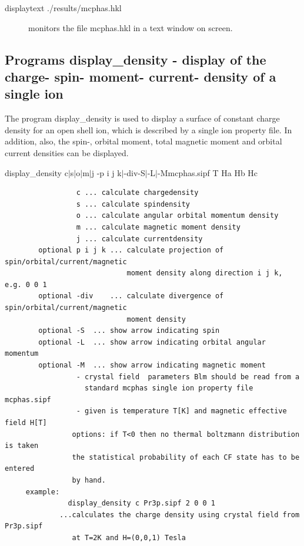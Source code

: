 \begin{description}
\item [displaytext ./results/mcphas.hkl] monitors the file mcphas.hkl in a text window
on screen.
\end{description} 

\subsection{Programs {\prg display\_density} 
- display of the charge- spin- moment- current- density of a single ion}\label{displaydensity}


The program {\prg display\_density} is used to display a surface of constant
charge density for an open shell ion, which is described by a single ion property file.
In addition, also, the spin-, orbital moment, total magnetic moment and orbital current
densities can be displayed. 


\begin{description} 
\item [ display\_density  c$|$s$|$o$|$m$|$j \lbrack -p i j k$|$-div\rbrack \lbrack -S$|$-L$|$-M\rbrack mcphas.sipf
 T Ha Hb Hc]
\end{description} 
\begin{verbatim}
                 c ... calculate chargedensity
                 s ... calculate spindensity
                 o ... calculate angular orbital momentum density
                 m ... calculate magnetic moment density
                 j ... calculate currentdensity
        optional p i j k ... calculate projection of spin/orbital/current/magnetic 
                             moment density along direction i j k, e.g. 0 0 1
        optional -div    ... calculate divergence of spin/orbital/current/magnetic 
                             moment density
        optional -S  ... show arrow indicating spin
        optional -L  ... show arrow indicating orbital angular momentum
        optional -M  ... show arrow indicating magnetic moment
                 - crystal field  parameters Blm should be read from a
                   standard mcphas single ion property file mcphas.sipf
                 - given is temperature T[K] and magnetic effective field H[T]
                options: if T<0 then no thermal boltzmann distribution is taken
                the statistical probability of each CF state has to be entered
                by hand.
     example:
               display_density c Pr3p.sipf 2 0 0 1
             ...calculates the charge density using crystal field from Pr3p.sipf
                at T=2K and H=(0,0,1) Tesla
\end{verbatim}

